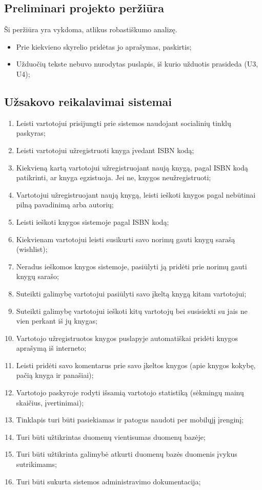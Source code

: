 \documentclass{VUMIFPSkursinis}
\begin{document}
	\subsection{Preliminari projekto peržiūra}
		Ši peržiūra yra vykdoma, atlikus robastiškumo analizę.	%
		\begin{itemize}
			\item Prie kiekvieno skyrelio pridėtas jo aprašymas, paskirtis;
			\item Užduočių tekste nebuvo nurodytas puslapis, iš kurio užduotis prasideda (U3, U4);
		\end{itemize}


	
\setcounter{secnumdepth}{0}
\subsection{Užsakovo reikalavimai sistemai}
\begin{enumerate}
	\item Leisti vartotojui prisijungti prie sistemos naudojant socialinių tinklų paskyras;
	\item Leisti vartotojui užregistruoti knyga įvedant ISBN kodą;
	\item Kiekvieną kartą vartotojui užregistruojant naują knygą, pagal ISBN kodą patikrinti,
		ar knyga egzistuoja. Jei ne, knygos neužregistruoti;
	\item Vartotojui užregistruojant naują knygą, leisti ieškoti knygos pagal 
		nebūtinai pilną pavadinimą arba autorių;
	\item Leisti ieškoti knygos sistemoje pagal ISBN kodą;
	\item Kiekvienam vartotojui leisti susikurti savo norimų gauti knygų sarašą (wishlist);
	\item Neradus ieškomos knygos sistemoje, pasiūlyti ją pridėti prie norimų gauti knygų sarašo;
	\item Suteikti galimybę vartotojui pasiūlyti savo įkeltą knygą kitam vartotojui;
	\item Suteikti galimybę vartotojui ieškoti kitų vartotojų bei susisiekti su jais ne vien
		perkant iš jų knygas;
	\item Vartotojo užregistruotos knygos puslapyje automatiškai pridėti knygos aprašymą
		iš interneto;
	\item Leisti pridėti savo komentarus prie savo įkeltos knygos (apie knygos kokybę,
		pačią knyga ir panašiai);
	\item Vartotojo paskyroje rodyti išsamią vartotojo statistiką (sėkmingų mainų skaičius,
		įvertinimai);
	\item Tinklapis turi būti pasiekiamas ir patogus naudoti per mobilųjį įrenginį;
	\item Turi būti užtikrintas duomenų vientisumas duomenų bazėje;
	\item Turi būti užtikrinta galimybė atkurti duomenų bazės duomenis įvykus sutrikimams;
	\item Turi būti sukurta sistemos administravimo dokumentacija;
\end{enumerate}
\end{document}
